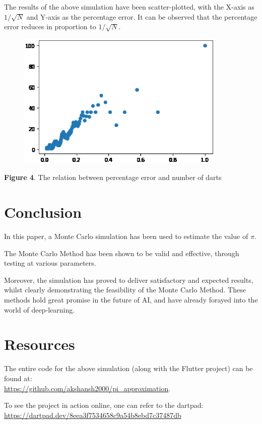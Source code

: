 \documentclass{resonance}
\begin{document}
	The results of the above simulation have been scatter-plotted, with the X-axis as $1/\sqrt{N}$ and Y-axis as the percentage error. It can be observed that the percentage error reduces in proportion to $1/\sqrt{N}$.
	
	\begin{figure}[H]
		\includegraphics[width=10cm]{error-plot}
	\end{figure}
	\vspace{-10pt}\hspace{43pt}\scriptsize{\textbf{Figure 4}. The relation between percentage error and number of darts}

	\normalsize
	\section{Conclusion}
	In this paper, a Monte Carlo simulation has been used to estimate the value of $\pi$.
	
	The Monte Carlo Method has been shown to be valid and effective, through testing at various parameters.
	
	Moreover, the simulation has proved to deliver satisfactory and expected results, whilst clearly demonstrating the feasibility of the Monte Carlo Method. These methods hold great promise in the future of AI, and have already forayed into the world of deep-learning.
	
	\section{Resources}
	The entire code for the above simulation (along with the Flutter project) can be found at:\\ \textcolor{blue}{\url{https://github.com/akshansh2000/pi_approximation}}.
	
	To see the project in action online, one can refer to the dartpad:\\
	\textcolor{blue}{\url{https://dartpad.dev/8eea3f7534658c9a54b8ebd7c37487db}}
	
\end{document}
